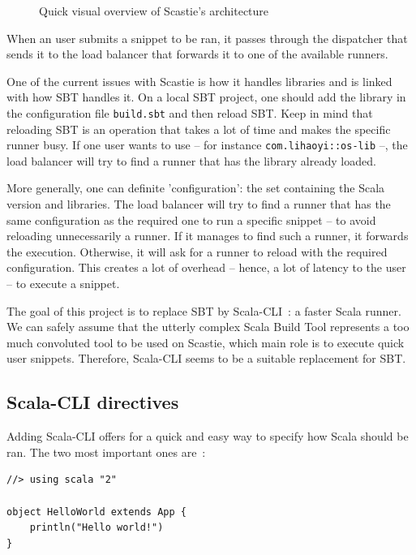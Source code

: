 \documentclass{article}
\begin{document}
\begin{figure}[h!]
    \centering
    
    \label{fig:scastie_architecture}
    \caption{Quick visual overview of Scastie's architecture}
\end{figure}

When an user submits a snippet to be ran, it passes through the dispatcher that sends it to the load balancer that forwards it to one of the
available runners.

One of the current issues with Scastie is how it handles libraries and is linked with how SBT handles it.
On a local SBT project, one should add the library in the configuration file \lstinline{build.sbt} and then reload SBT.
Keep in mind that reloading SBT is an operation that takes a lot of time and makes the specific runner busy.
If one user wants to use -- for instance \lstinline{com.lihaoyi::os-lib} --, the load balancer will try to find a runner that has
the library already loaded.

More generally, one can definite 'configuration': the set containing the Scala version and libraries. The load balancer will try to find a
runner that has the same configuration as the required one to run a specific snippet -- to avoid reloading unnecessarily a runner.
If it manages to find such a runner, it forwards the execution. Otherwise, it will ask for a runner to reload with the
required configuration. This creates a lot of overhead -- hence, a lot of latency to the user -- to execute a snippet.

The goal of this project is to replace SBT by Scala-CLI~: a faster Scala runner. We can safely assume that the utterly complex Scala Build
Tool represents a too much convoluted tool to be used on Scastie, which main role is to execute quick user snippets.
Therefore, Scala-CLI seems to be a suitable replacement for SBT.

\subsection{Scala-CLI directives}

Adding Scala-CLI offers for a quick and easy way to specify how Scala should be ran. The two most important ones are~:

\begin{lstlisting}[style=sc]
//> using scala "2"

object HelloWorld extends App {
    println("Hello world!")
}
\end{lstlisting}
\end{document}
